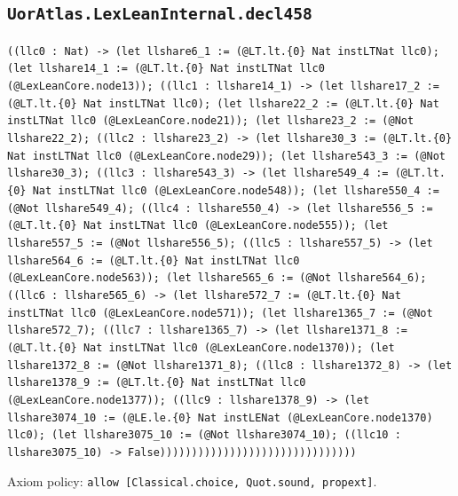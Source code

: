 \documentclass[11pt]{article}
\begin{document}
\subsection*{\texttt{UorAtlas.LexLeanInternal.decl458}}
\noindent\texttt{((llc0 : Nat) -> (let llshare6\_1 := (@LT.lt.\{0\} Nat instLTNat llc0); (let llshare14\_1 := (@LT.lt.\{0\} Nat instLTNat llc0 (@LexLeanCore.node13)); ((llc1 : llshare14\_1) -> (let llshare17\_2 := (@LT.lt.\{0\} Nat instLTNat llc0); (let llshare22\_2 := (@LT.lt.\{0\} Nat instLTNat llc0 (@LexLeanCore.node21)); (let llshare23\_2 := (@Not llshare22\_2); ((llc2 : llshare23\_2) -> (let llshare30\_3 := (@LT.lt.\{0\} Nat instLTNat llc0 (@LexLeanCore.node29)); (let llshare543\_3 := (@Not llshare30\_3); ((llc3 : llshare543\_3) -> (let llshare549\_4 := (@LT.lt.\{0\} Nat instLTNat llc0 (@LexLeanCore.node548)); (let llshare550\_4 := (@Not llshare549\_4); ((llc4 : llshare550\_4) -> (let llshare556\_5 := (@LT.lt.\{0\} Nat instLTNat llc0 (@LexLeanCore.node555)); (let llshare557\_5 := (@Not llshare556\_5); ((llc5 : llshare557\_5) -> (let llshare564\_6 := (@LT.lt.\{0\} Nat instLTNat llc0 (@LexLeanCore.node563)); (let llshare565\_6 := (@Not llshare564\_6); ((llc6 : llshare565\_6) -> (let llshare572\_7 := (@LT.lt.\{0\} Nat instLTNat llc0 (@LexLeanCore.node571)); (let llshare1365\_7 := (@Not llshare572\_7); ((llc7 : llshare1365\_7) -> (let llshare1371\_8 := (@LT.lt.\{0\} Nat instLTNat llc0 (@LexLeanCore.node1370)); (let llshare1372\_8 := (@Not llshare1371\_8); ((llc8 : llshare1372\_8) -> (let llshare1378\_9 := (@LT.lt.\{0\} Nat instLTNat llc0 (@LexLeanCore.node1377)); ((llc9 : llshare1378\_9) -> (let llshare3074\_10 := (@LE.le.\{0\} Nat instLENat (@LexLeanCore.node1370) llc0); (let llshare3075\_10 := (@Not llshare3074\_10); ((llc10 : llshare3075\_10) -> False)))))))))))))))))))))))))))))))}\par
\noindent Axiom policy: \texttt{allow [Classical.choice, Quot.sound, propext]}.\par
\end{document}
